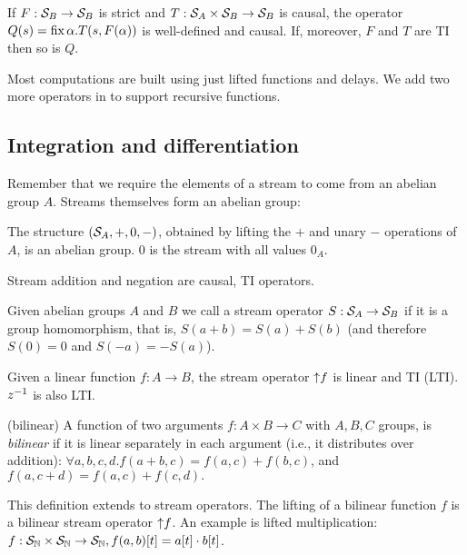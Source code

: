 \begin{lemma}\label{feedback-semantics}
\label{cor-loop}
If $F: \mathcal{S}_{B} \to \mathcal{S}_{B}$ is strict and $T: \mathcal{S}_{A} \times \mathcal{S}_{B} \to \mathcal{S}_{B}$ is causal,
the operator $Q(s)=\mbox{fix}\,\alpha.T(s,F(\alpha))$ is well-defined and causal.
If, moreover, $F$ and $T$ are TI then so is $Q$.
\end{lemma}

Most \dbsp computations are built using just lifted functions and
delays.  We add two more operators in  to support
recursive functions.

\subsection{Integration and differentiation}\label{sec:abelianstreams}

Remember that we require the elements of a stream to come from an abelian group $A$.
Streams themselves form an abelian group:

\begin{proposition}
The structure $(\mathcal{S}_{A},+,0,-)$, obtained by lifting the $+$ and unary $-$ operations of $A$,
is an abelian group.  0 is the stream with all values $0_A$.
\end{proposition}

\noindent
Stream addition and negation are causal, TI operators.

\begin{definition}
Given abelian groups $A$ and $B$ we call a stream operator
$S: \mathcal{S}_{A} \rightarrow \mathcal{S}_{B}$  if it is a group homomorphism, that is,
$S(a+b)=S(a)+S(b)$ (and therefore $S(0)=0$ and $S(-a)=-S(a)$).
\end{definition}

Given a linear function $f: A \to B$, the stream operator ${\uparrow}f$
is linear and TI (LTI).  $z^{-1}$ is also LTI.

\begin{definition}(bilinear)
A function of two arguments $f: A \times B \to C$ with $A, B, C$ groups, is \emph{bilinear}
if it is linear separately in each argument (i.e., it distributes over addition):
$\forall a, b, c, d . f(a+b, c) = f(a, c) + f(b, c)$, and $f(a, c+d) = f(a, c) + f(c, d).$
\end{definition}

This definition extends to stream operators.
The lifting of a bilinear function $f$ is
a bilinear stream operator ${\uparrow}f$.  An example
is lifted multiplication:
$f: \mathcal{S}_{\mathbb{N}} \times \mathcal{S}_{\mathbb{N}} \to \mathcal{S}_{\mathbb{N}}, f(a, b)[t] = a[t]\cdot b[t]$.

